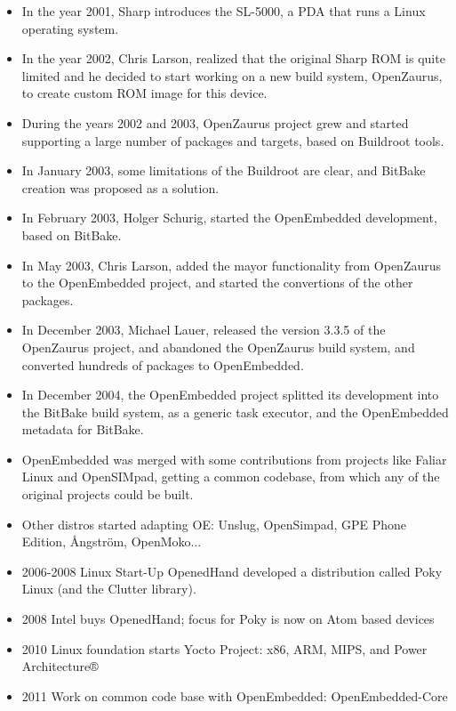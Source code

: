 \documentclass[a4paper,11pt,openany]{report}
\begin{document}
\begin{itemize}
\item In the year 2001, Sharp introduces the SL-5000, a PDA that runs a Linux operating system.
\item In the year 2002, Chris Larson, realized that the original Sharp ROM is quite limited and he decided to start working on a new build system, OpenZaurus\cite{openzaurus}, to create custom ROM image for this device.
\item During the years 2002 and 2003, OpenZaurus project grew and started supporting a large number of packages and targets, based on Buildroot tools.
\item In January 2003, some limitations of the Buildroot\cite{buildroot} are clear, and BitBake\cite{bitbake} creation was proposed as a solution.
\item In February 2003, Holger Schurig, started the OpenEmbedded\cite{openembedded} development, based on BitBake.
\item In May 2003, Chris Larson, added the mayor functionality from OpenZaurus to the OpenEmbedded project, and started the convertions of the other packages.
\item In December 2003, Michael Lauer, released the version 3.3.5 of the OpenZaurus project, and abandoned the OpenZaurus build system, and converted hundreds of packages to OpenEmbedded.
\item In December 2004, the OpenEmbedded project splitted its development into the BitBake build system, as a generic task executor, and the OpenEmbedded metadata for BitBake.
\item OpenEmbedded was merged with some contributions from projects like Faliar Linux and OpenSIMpad, getting a common codebase, from which any of the original projects could be built.
\item Other distros started adapting OE: Unslug, OpenSimpad, GPE Phone Edition, Ångström, OpenMoko... 
\item 2006-2008 Linux Start-Up OpenedHand developed a distribution called Poky Linux\cite{poky} (and the Clutter library).
\item 2008 Intel buys OpenedHand; focus for Poky is now on Atom based devices
\item 2010 Linux foundation starts Yocto Project: x86, ARM, MIPS, and Power Architecture®
\item 2011 Work on common code base with OpenEmbedded: OpenEmbedded-Core 
\end{itemize}
\end{document}
